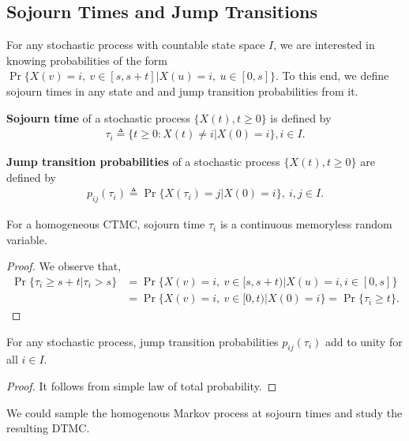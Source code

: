 \documentclass[a4paper,10pt,english]{article}
\begin{document}
\subsection{Sojourn Times and Jump Transitions}
For any stochastic process with countable state space $I$, we are interested in knowing probabilities of the form $\Pr\{X(v)=i,~v \in [s,s+t] | X(u)=i, ~ u \in [0,s]\}$.
To this end, we define sojourn times in any state and and jump transition probabilities from it.
\begin{defn}
\textbf{Sojourn time} of a stochastic process $\{X(t), t \geqslant 0\}$ is defined by
\begin{align*}
\tau_i \triangleq \{t \geqslant 0: X(t) \neq i|X(0)=i\}, i \in I. 
\end{align*}
\end{defn}
\begin{defn}
\textbf{Jump transition probabilities} of a stochastic process $\{X(t), t \geqslant 0\}$ are defined by
\begin{align*}
p_{ij}(\tau_i) \triangleq \Pr\{X(\tau_i)  = j | X(0) =  i \}, ~i,j \in I.
\end{align*}
\end{defn}
\begin{lem}\label{Lemma:MemorylessSojourn}
For a homogeneous CTMC, sojourn time $\tau_i$ is a continuous memoryless random variable. %
\end{lem}
\begin{proof}
We observe that,
\begin{align*}
\Pr\{\tau_i \geqslant s+t | \tau_i > s\} &=\Pr\{X(v)=i,~v \in [s,s+t) | X(u)=i,  i \in [0, s]\}\\
&= \Pr\{X(v)=i,~v \in [0,t) | X(0)=i\} = \Pr\{\tau_i \geqslant t \}.
\end{align*}
\end{proof}
\begin{lem}\label{Lemma:JumpProb}
For any stochastic process, jump transition probabilities $p_{ij}(\tau_i)$ add to unity for all $i \in I$.
\end{lem}
\begin{proof}
It follows from simple law of total probability.
\end{proof}
We could sample the homogenous Markov process at sojourn times and study the resulting DTMC. 
\end{document}
